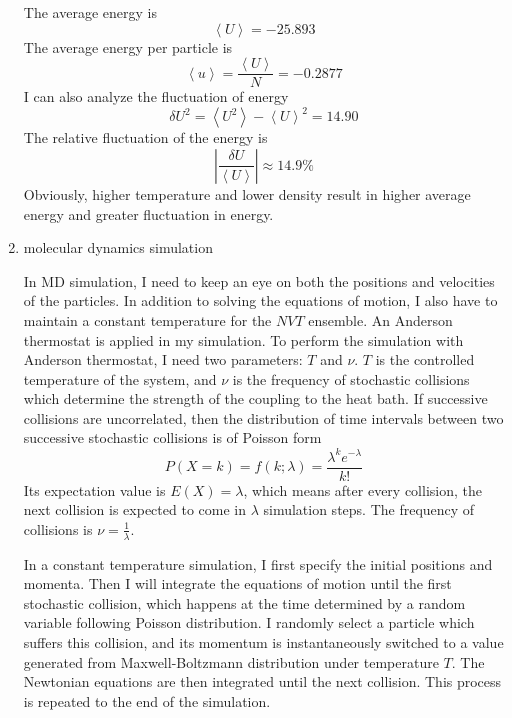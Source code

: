 \documentclass[letterpaper,12pt]{article}
\numberwithin{equation}{section}
\begin{document}
\begin{enumerate}[label=(\alph*)]
\begin{figure}[H]
    \end{figure}
    The average energy is 
    \begin{equation}
        \left\langle U\right\rangle=-25.893
    \end{equation}
    The average energy per particle is 
    \begin{equation}
        \left\langle u\right\rangle=\frac{\left\langle U\right\rangle}{N}=-0.2877
    \end{equation}
    I can also analyze the fluctuation of energy
    \begin{equation}
        \delta U^2=\left \langle U^2\right\rangle-\left \langle U\right\rangle^2=14.90
    \end{equation}
    The relative fluctuation of the energy is
    \begin{equation}
        \left| \frac{\delta U}{\left \langle U\right\rangle} \right|\approx 14.9\%
    \end{equation}
    Obviously, higher temperature and lower density result in higher average energy and greater fluctuation in energy. 

    \item molecular dynamics simulation
    
    In MD simulation, I need to keep an eye on both the positions and velocities of the particles. In addition to solving the equations of motion, I also have to maintain a constant temperature for the $NVT$ ensemble. An Anderson thermostat is applied in my simulation. To perform the simulation with Anderson thermostat, I need two parameters: $T$ and $\nu$.  $T$ is the controlled temperature of the system, and $\nu$ is the frequency of stochastic collisions which determine the strength of the coupling to the heat bath. If successive collisions are uncorrelated, then the distribution of time intervals between two successive stochastic collisions is of Poisson form
    \begin{equation}
        P(X=k)=f(k;\lambda)=\frac{\lambda^k e^{-\lambda}}{k!}
    \end{equation}
    Its expectation value is $E(X)=\lambda$, which means after every collision, the next collision is expected to come in $\lambda$ simulation steps. The frequency of collisions is $\nu=\frac{1}{\lambda}$. 

    In a constant temperature simulation, I first specify the initial positions and momenta. Then I will integrate the equations of motion until the first stochastic collision, which happens at the time determined by a random variable following Poisson distribution. I randomly select a particle which suffers this collision, and its momentum is instantaneously switched to a value generated from Maxwell-Boltzmann distribution under temperature $T$. The Newtonian equations are then integrated until the next collision. This process is repeated to the end of the simulation.


\end{enumerate}
\end{document}
